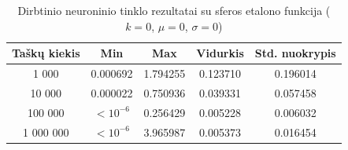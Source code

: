 \begin{table}[H]
    \centering
    \begin{tabular}{|c|c|c|c|c|}
        \hline
        \textbf{Taškų kiekis} & \textbf{Min} & \textbf{Max} & \textbf{Vidurkis} & \textbf{Std. nuokrypis} \\ \hline
        1 000        & 0.000692 & 1.794255 & 0.123710 & 0.196014 \\ \hline
        10 000       & 0.000022 & 0.750936 & 0.039331 & 0.057458 \\ \hline
        100 000      & $<10^{-6}$ & 0.256429 & 0.005228 & 0.006032 \\ \hline
        1 000 000    & $<10^{-6}$ & 3.965987 & 0.005373 & 0.016454 \\ \hline
    \end{tabular}
    \caption{Dirbtinio neuroninio tinklo rezultatai su sferos etalono funkcija ($k = 0$, $\mu = 0$, $\sigma = 0$)}
\end{table}